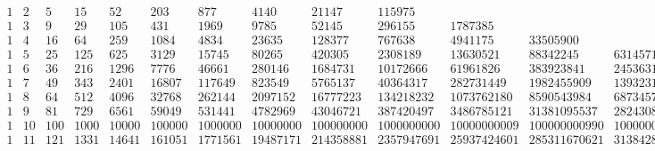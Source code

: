\documentclass{article}
\begin{document}
\begin{doublespace}
\noindent\(\begin{array}{lllllllllllllllllll}
 1 & 2 & 5 & 15 & 52 & 203 & 877 & 4140 & 21147 & 115975 & \text{} & \text{} & \text{} & \text{} & \text{} & \text{} & \text{} & \text{} & \text{}
\\
 1 & 3 & 9 & 29 & 105 & 431 & 1969 & 9785 & 52145 & 296155 & 1787385 & \text{} & \text{} & \text{} & \text{} & \text{} & \text{} & \text{} & \text{}
\\
 1 & 4 & 16 & 64 & 259 & 1084 & 4834 & 23635 & 128377 & 767638 & 4941175 & 33505900 & \text{} & \text{} & \text{} & \text{} & \text{} & \text{} &
\text{} \\
 1 & 5 & 25 & 125 & 625 & 3129 & 15745 & 80265 & 420305 & 2308189 & 13630521 & 88342245 & 631457185 & \text{} & \text{} & \text{} & \text{} & \text{}
& \text{} \\
 1 & 6 & 36 & 216 & 1296 & 7776 & 46661 & 280146 & 1684731 & 10172666 & 61961826 & 383923841 & 2453631456 & 16501687671 & \text{} & \text{} & \text{}
& \text{} & \text{} \\
 1 & 7 & 49 & 343 & 2401 & 16807 & 117649 & 823549 & 5765137 & 40364317 & 282731449 & 1982455909 & 13932313633 & 98372115379 & 700932023569 & \text{}
& \text{} & \text{} & \text{} \\
 1 & 8 & 64 & 512 & 4096 & 32768 & 262144 & 2097152 & 16777223 & 134218232 & 1073762180 & 8590543984 & 68734579502 & 550084404304 & 4404552712484
& 35304476269175 & \text{} & \text{} & \text{} \\
 1 & 9 & 81 & 729 & 6561 & 59049 & 531441 & 4782969 & 43046721 & 387420497 & 3486785121 & 31381095537 & 282430851969 & 2541905347473 & 22877826301089
& 205915564377777 & 1853554829160897 & \text{} & \text{} \\
 1 & 10 & 100 & 1000 & 10000 & 100000 & 1000000 & 10000000 & 100000000 & 1000000000 & 10000000009 & 100000000990 & 1000000059805 & 10000002628810
& 100000094101795 & 1000002913442722 & 10000080973753795 & 100002071690392510 & \text{} \\
 1 & 11 & 121 & 1331 & 14641 & 161051 & 1771561 & 19487171 & 214358881 & 2357947691 & 25937424601 & 285311670621 & 3138428378041 & 34522712238861
& 379749838516081 & 4177248376837701 & 45949737363591721 & 505447270635426141 & 5559924473343948961 \\
\end{array}\)
\end{doublespace}

\begin{doublespace}
\noindent\(\pmb{\text{}}\)
\end{doublespace}
\end{document}
